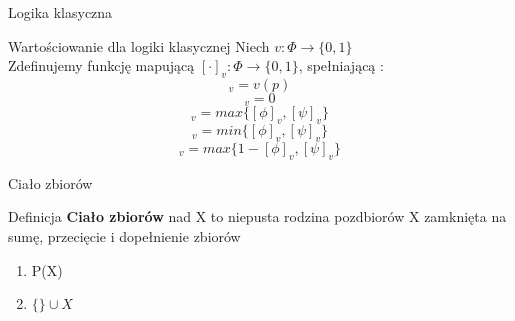 \documentclass{beamer}
\begin{document}
\begin{frame}{Logika klasyczna}
 \begin{block}{Wartościowanie dla logiki klasycznej}
 Niech \( v : \Phi \rightarrow \{0,1\}\)\\
 Zdefinujemy funkcję mapującą  \( [ \cdot ]_v : \Phi \rightarrow \{ 0, 1 \}\), spełniającą :
 \begin{equation*}
 	[p]_v = v ( p)
 \end{equation*} 
 \begin{equation*}
 	[\bot]_v = 0
 \end{equation*} 
  \begin{equation*}
 	[\phi \vee \psi]_v = max\{[\phi]_v, [\psi]_v\}
 \end{equation*}
  \begin{equation*}
 	[\phi \wedge \psi]_v = min\{[\phi]_v, [\psi]_v\}
 \end{equation*}
  \begin{equation*}
 	[\phi \rightarrow \psi]_v = max\{1-[\phi]_v, [\psi]_v\}
 \end{equation*}
 	
 \end{block}
\end{frame}


\begin{frame}{Ciało zbiorów}
 \begin{block}{Definicja}
 \textbf{Ciało zbiorów} nad X to niepusta rodzina pozdbiorów X zamknięta na sumę, przecięcie i dopełnienie zbiorów
 \end{block}
 \begin{example}
 \begin{enumerate}
 \item P(X)
 \item \( \{\} \cup X\)
 \end{enumerate}
 \end{example}
\end{frame}
\end{document}
